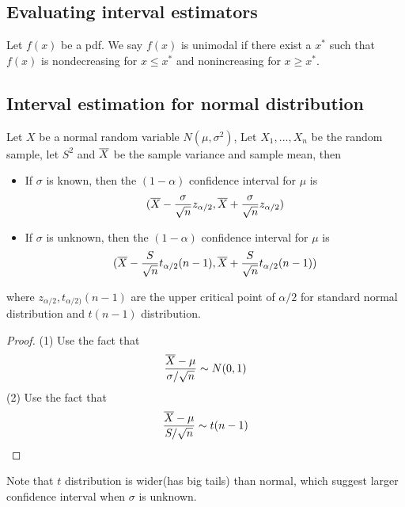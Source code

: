\begin{refsection}
\subsection{Evaluating interval estimators}
\begin{definition}
	Let $f(x)$ be a pdf. We say $f(x)$ is unimodal if there exist a $x^*$ such that $f(x)$ is nondecreasing for $x\leq x^*$ and nonincreasing for $x \geq x^*$.
\end{definition}


\subsection{Interval estimation for normal distribution}



\begin{lemma}
Let $X$ be a normal random variable $N(\mu,\sigma^2)$, Let $X_1,...,X_n$ be the random sample, let $S^2$ and $\overline{X}$ be the sample variance and sample mean, then
\begin{itemize}
	\item If $\sigma$ is known, then the $(1-\alpha)$ confidence interval for $\mu$ is
	$$(\overline{X} - \frac{\sigma}{\sqrt{n}}z_{\alpha/2},\overline{X} + \frac{\sigma}{\sqrt{n}}z_{\alpha/2})$$
	\item If $\sigma$ is unknown, then the $(1-\alpha)$ confidence interval for $\mu$ is
	$$(\overline{X} - \frac{S}{\sqrt{n}}t_{\alpha/2}(n-1),\overline{X} + \frac{S}{\sqrt{n}}t_{\alpha/2}(n-1))$$
\end{itemize}
where $z_{\alpha/2},t_{\alpha/2)}(n-1)$ are the upper critical point of $\alpha/2$ for standard normal distribution and $t(n-1)$ distribution.
\end{lemma}
\begin{proof}
(1) Use the fact that 
$$\frac{\overline{X}-\mu}{\sigma/\sqrt{n}} \sim N(0,1)$$
(2) Use the fact that
$$\frac{\overline{X}-\mu}{S/\sqrt{n}} \sim t(n-1)$$
\end{proof}

\begin{remark}
Note that $t$ distribution is wider(has big tails) than normal, which suggest larger confidence interval when $\sigma$ is unknown.
\end{remark}




\end{refsection}
